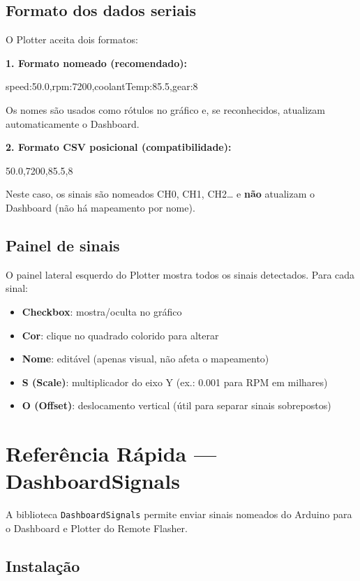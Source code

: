 \documentclass[12pt,a4paper]{article}
\begin{document}
\subsection{Formato dos dados seriais}

O Plotter aceita dois formatos:

\textbf{1. Formato nomeado (recomendado):}
\begin{codigobox}
speed:50.0,rpm:7200,coolantTemp:85.5,gear:8
\end{codigobox}

Os nomes são usados como rótulos no gráfico e, se reconhecidos, atualizam automaticamente o Dashboard.

\textbf{2. Formato CSV posicional (compatibilidade):}
\begin{codigobox}
50.0,7200,85.5,8
\end{codigobox}

Neste caso, os sinais são nomeados CH0, CH1, CH2\ldots{} e \textbf{não} atualizam o Dashboard (não há mapeamento por nome).

\subsection{Painel de sinais}

O painel lateral esquerdo do Plotter mostra todos os sinais detectados. Para cada sinal:
\begin{itemize}[nosep]
  \item \textbf{Checkbox}: mostra/oculta no gráfico
  \item \textbf{Cor}: clique no quadrado colorido para alterar
  \item \textbf{Nome}: editável (apenas visual, não afeta o mapeamento)
  \item \textbf{S (Scale)}: multiplicador do eixo Y (ex.: 0.001 para RPM em milhares)
  \item \textbf{O (Offset)}: deslocamento vertical (útil para separar sinais sobrepostos)
\end{itemize}


\section{Referência Rápida --- DashboardSignals}

A biblioteca \texttt{DashboardSignals} permite enviar sinais nomeados do Arduino para o Dashboard e Plotter do Remote Flasher.

\subsection{Instalação}
\end{document}
